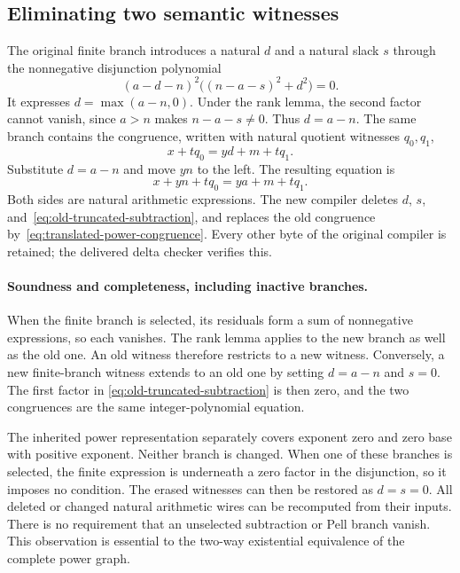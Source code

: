 \documentclass[11pt,letterpaper]{article}
\theoremstyle{remark}\newtheorem{remark}[theorem]{Remark}
\begin{document}
\subsection{Eliminating two semantic witnesses}

The original finite branch introduces a natural $d$ and a natural slack $s$
through the nonnegative disjunction polynomial
\begin{equation}\label{eq:old-truncated-subtraction}
 (a-d-n)^2\bigl((n-a-s)^2+d^2\bigr)=0.
\end{equation}
It expresses $d=\max(a-n,0)$. Under the rank lemma, the second factor
cannot vanish, since $a>n$ makes $n-a-s\ne0$. Thus $d=a-n$.
The same branch contains the congruence, written with natural quotient
witnesses $q_0,q_1$,
\[
 x+tq_0=yd+m+tq_1.
\]
Substitute $d=a-n$ and move $yn$ to the left. The resulting equation is
\begin{equation}\label{eq:translated-power-congruence}
 x+yn+tq_0=ya+m+tq_1.
\end{equation}
Both sides are natural arithmetic expressions. The new compiler deletes
$d$, $s$, and~\eqref{eq:old-truncated-subtraction}, and replaces the old
congruence by~\eqref{eq:translated-power-congruence}. Every other byte of
the original compiler is retained; the delivered delta checker verifies this.

\paragraph{Soundness and completeness, including inactive branches.}
When the finite branch is selected, its residuals form a sum of
nonnegative expressions, so each vanishes. The rank lemma applies to the
new branch as well as the old one. An old witness therefore restricts to a
new witness. Conversely, a new finite-branch witness extends to an old one
by setting $d=a-n$ and $s=0$. The first factor in
\eqref{eq:old-truncated-subtraction} is then zero, and the two congruences
are the same integer-polynomial equation.

The inherited power representation separately covers exponent zero and
zero base with positive exponent. Neither branch is changed. When one of
these branches is selected, the finite expression is underneath a zero
factor in the disjunction, so it imposes no condition. The erased witnesses
can then be restored as $d=s=0$. All deleted or changed natural arithmetic
wires can be recomputed from their inputs. There is no requirement that an
unselected subtraction or Pell branch vanish. This observation is essential
to the two-way existential equivalence of the complete power graph.
\end{document}
